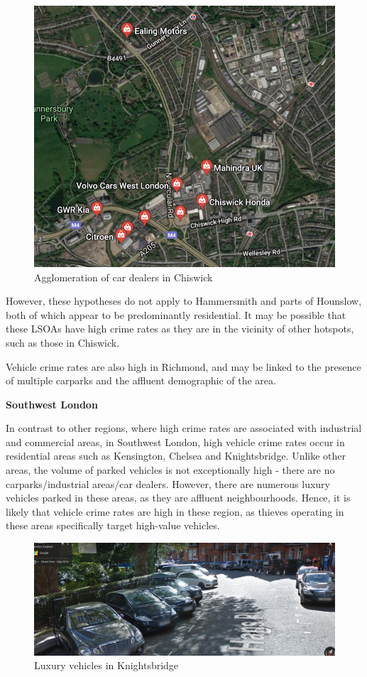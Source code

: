 \documentclass[]{article}
\theoremstyle{definition}
\theoremstyle{definition}
\theoremstyle{definition}
\theoremstyle{remark}
\begin{document}
\begin{figure}
\centering
\includegraphics{pictures/chiswickcardealers.png}
\caption{Agglomeration of car dealers in Chiswick}
\end{figure}

However, these hypotheses do not apply to Hammersmith and parts of
Hounslow, both of which appear to be predominantly residential. It may
be possible that these LSOAs have high crime rates as they are in the
vicinity of other hotspots, such as those in Chiswick.

Vehicle crime rates are also high in Richmond, and may be linked to the
presence of multiple carparks and the affluent demographic of the area.

\textbf{Southwest London}

In contrast to other regions, where high crime rates are associated with
industrial and commercial areas, in Southwest London, high vehicle crime
rates occur in residential areas such as Kensington, Chelsea and
Knightsbridge. Unlike other areas, the volume of parked vehicles is not
exceptionally high - there are no carparks/industrial areas/car dealers.
However, there are numerous luxury vehicles parked in these areas, as
they are affluent neighbourhoods. Hence, it is likely that vehicle crime
rates are high in these region, as thieves operating in these areas
specifically target high-value vehicles.

\begin{figure}
\centering
\includegraphics{pictures/Knightsbridge.png}
\caption{Luxury vehicles in Knightsbridge}
\end{figure}
\end{document}
